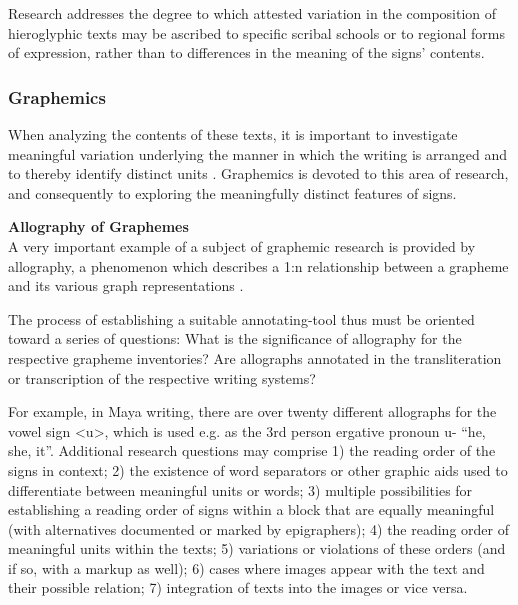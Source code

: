 \documentclass[amsthm,ebook]{saparticle}
\begin{document}
Research addresses the degree to which attested variation in the composition of hieroglyphic texts may be ascribed to
specific scribal schools or to regional forms of expression, rather than to differences in the meaning of the signs’
contents. 




\subsubsection{Graphemics }
When analyzing the contents of these texts, it is important to investigate meaningful variation underlying the manner in
which the writing is arranged and to thereby identify distinct units \citep{Bussmann2002}. Graphemics is devoted to this area
of research, and consequently to exploring the meaningfully distinct features of signs. 



\vspace{0.5cm}
\noindent\textbf{Allography of Graphemes }\\
A very important example of a subject of graphemic research is provided by allography, a phenomenon which describes a
1:n relationship between a grapheme and its various graph representations \citep{Crystal1997}. 

The process of establishing a suitable annotating-tool thus must be oriented toward a series of questions: What is the
significance of allography for the respective grapheme inventories? Are allographs annotated in the transliteration or
transcription of the respective writing systems? 

For example, in Maya writing, there are over twenty different allographs for the vowel sign {\textless}u{\textgreater},
which is used e.g. as the 3rd person ergative pronoun u- ``he, she, it''. Additional research questions may comprise 1)
the reading order of the signs in context; 2) the existence of word separators or other graphic aids used to
differentiate between meaningful units or words; 3) multiple possibilities for establishing a reading order of signs
within a block that are equally meaningful (with alternatives documented or marked by epigraphers); 4) the reading
order of meaningful units within the texts; 5) variations or violations of these orders (and if so, with a markup as
well); 6) cases where images appear with the text and their possible relation; 7) integration of texts into the images
or vice versa.
\end{document}
